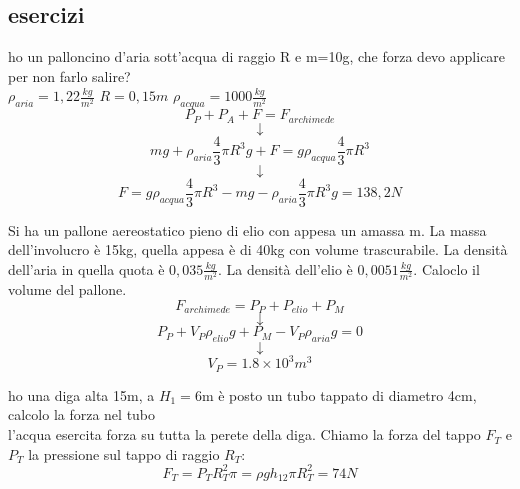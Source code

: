 \documentclass[a4paper,12pt, oneside]{book}
\begin{document}
\subsection{esercizi}
\begin{esercizio}
ho un palloncino d'aria sott'acqua di raggio R e m=10g, che forza devo applicare per non farlo salire? \\$\rho_{aria}=1,22 \frac{kg}{m^2}$ $R=0,15m$ $\rho_{acqua}=1000 \frac{kg}{m^2}$\\
$$P_P+P_A+F=F_{archimede}$$
$$\downarrow$$
$$mg+\rho_{aria}\frac{4}{3}\pi R^3g+F=g\rho_{acqua}\frac{4}{3}\pi R^3$$
$$\downarrow$$
$$F=g\rho_{acqua}\frac{4}{3}\pi R^3-mg-\rho_{aria}\frac{4}{3}\pi R^3g=138,2N$$
\end{esercizio}
\begin{esercizio}
Si ha un pallone aereostatico pieno di elio con appesa un amassa m. La massa dell'involucro è 15kg, quella appesa è di 40kg con volume trascurabile. La densità dell'aria in quella quota è $0,035 \frac{kg}{m^2}$. La densità dell'elio è $0,0051 \frac{kg}{m^2}$. Caloclo il volume del pallone.\\
$$F_{archimede}=P_P+P_{elio}+P_M$$
$$\downarrow$$
$$P_P+V_P\rho_{elio}g+P_M-V_P\rho_{aria}g=0$$
$$\downarrow$$
$$V_P=1.8\times 10^3 m^3$$
\end{esercizio}
\begin{esercizio}
ho una diga alta 15m, a $H_1=$6m è posto un tubo tappato di diametro 4cm, calcolo la forza nel tubo\\
l'acqua esercita forza su tutta la perete della diga. Chiamo la forza del tappo $F_T$ e $P_T$ la pressione sul tappo di raggio $R_T$:
$$F_T=P_TR_T^2\pi=\rho g h_12\pi R_T^2=74N$$
\end{esercizio}

\newpage
\end{document}
